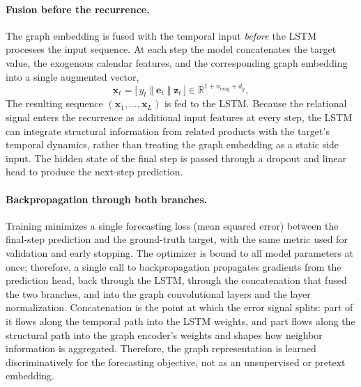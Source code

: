 \paragraph{Fusion before the recurrence.}
The graph embedding is fused with the temporal input \emph{before} the LSTM processes the input sequence. At each step the model concatenates the target value, the exogenous calendar features, and the corresponding graph embedding into a single augmented vector,
\[
\mathbf{x}_t = \big[\, y_t \;\Vert\; \mathbf{e}_t \;\Vert\; \mathbf{z}_t \,\big]
\in \mathbb{R}^{1 + n_\text{exog} + d_g},
\]
The resulting sequence $(\mathbf{x}_1, \dots, \mathbf{x}_L)$ is fed to the LSTM. Because the relational signal enters the recurrence as additional input features at every step, the LSTM can integrate structural information from related products with the target’s temporal dynamics, rather than treating the graph embedding as a static side input. The hidden state of the final step is passed through a dropout and linear head to produce the next-step prediction.

\paragraph{Backpropagation through both branches.}
Training minimizes a single forecasting loss (mean squared error) between the final-step prediction and the ground-truth target, with the same metric used for validation and early stopping. The optimizer is bound to all model parameters at once; therefore, a single call to backpropagation propagates gradients from the prediction head, back through the LSTM, through the concatenation that fused the two branches, and into the graph convolutional layers and the layer normalization. Concatenation is the point at which the error signal splits: part of it flows along the temporal path into the LSTM weights, and part flows along the structural path into the graph encoder's weights and shapes how neighbor information is aggregated. Therefore, the graph representation is learned discriminatively for the forecasting objective, not as an unsupervised or pretext embedding.

